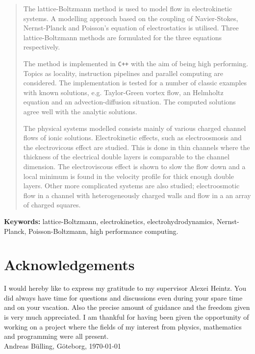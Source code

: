\begin{abstract}
The lattice-Boltzmann method is used to model flow in electrokinetic
systems. A modelling approach based on the coupling of Navier-Stokes,
Nernst-Planck and Poisson's equation of electrostatics is
utilised. Three lattice-Boltzmann methods are formulated for the three
equations respectively.

The method is implemented in \texttt{C++} with the aim of being high
performing. Topics as locality, instruction pipelines and parallel
computing are considered. The implementation is tested for a number of
classic examples with known solutions, e.g.  Taylor-Green vortex flow,
an Helmholtz equation and an advection-diffusion situation. The
computed solutions agree well with the analytic solutions.

The physical systems modelled consists mainly of various charged
channel flows of ionic solutions. Electrokinetic effects, such as
electroosmosis and the electrovicous effect are studied. This is done
in thin channels where the thickness of the electrical double layers
is comparable to the channel dimension. The electroviscous effect is
shown to slow the flow down and a local minimum is found in the
velocity profile for thick enough double layers. Other more
complicated systems are also studied; electroosmotic flow in a channel
with heterogeneously charged walls and flow in a an array of charged
squares.
\end{abstract}

\noindent \textbf{Keywords:} lattice-Boltzmann, electrokinetics,
electrohydrodynamics, Nernst-Planck, Poisson-Boltzmann,
high performance computing.

\newpage
\clearpage
\mbox{}
\newpage
\clearpage
\thispagestyle{empty}
\section*{Acknowledgements}
I would hereby like to express my gratitude to my supervisor Alexei
Heintz. You did always have time for questions and discussions even
during your spare time and on your vacation. Also the precise amount
of guidance and the freedom given is very much appreciated. I am
thankful for having been given the opportunity of working on a project
where the fields of my interest from physics, mathematics and
programming were all present.  \\[1cm]

\hfill Andreas B\"{u}lling, G\"{o}teborg, \today
\newpage
\clearpage
\mbox{}
